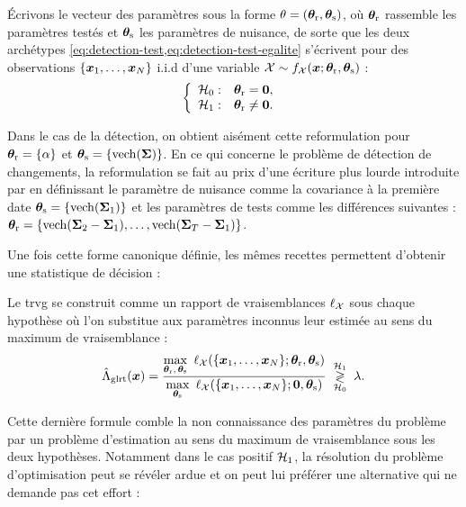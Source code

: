 Écrivons le vecteur des paramètres sous la forme $\theta=(\boldsymbol{\theta}_{\mathrm{r}},\boldsymbol{\theta}_{\mathrm{s}})$, où $\boldsymbol{\theta}_{\mathrm{r}}$ rassemble les paramètres testés et $\boldsymbol{\theta}_{\mathrm{s}}$ les paramètres de nuisance, de sorte que les deux archétypes \cref{eq:detection-test,eq:detection-test-egalite} s'écrivent pour des observations $\{\boldsymbol{x}_1, \dots, \boldsymbol{x}_N\}$ i.i.d d'une variable $\mathcal{X}\sim f_{\mathcal{X}}(\boldsymbol{x}; \boldsymbol{\theta}_{\mathrm{r}},\boldsymbol{\theta}_{\mathrm{s}})$ :
\begin{equation}
  \left\{
  \begin{array}{ll}
    \mathcal{H}_0: & \boldsymbol{\theta}_{\mathrm{r}} = \boldsymbol{0},\  \\
    \mathcal{H}_1: & \boldsymbol{\theta}_{\mathrm{r}} \neq \boldsymbol{0}.
  \end{array}
  \right.
  \label{eq:detection-test-parametre}
\end{equation}

Dans le cas de la détection, on obtient aisément cette reformulation pour $\boldsymbol{\theta}_{\mathrm{r}}=\{\alpha\}$ et $\boldsymbol{\theta}_{\mathrm{s}}=\{\operatorname{\operatorname{vech}}(\boldsymbol{\Sigma})\}$. En ce qui concerne le problème de détection de changements, la reformulation se fait au prix d'une écriture plus lourde introduite par  en définissant le paramètre de nuisance comme la covariance à la première date $\boldsymbol{\theta}_{\mathrm{s}}=\{\operatorname{\operatorname{vech}}(\boldsymbol{\Sigma}_1)\}$ et les paramètres de tests comme les différences suivantes : $\boldsymbol{\theta}_{\mathrm{r}} = \{\operatorname{\operatorname{vech}}(\boldsymbol{\Sigma}_2-\boldsymbol{\Sigma}_1), \dots, \operatorname{\operatorname{vech}}(\boldsymbol{\Sigma}_T-\boldsymbol{\Sigma}_1)\}$.

Une fois cette forme canonique définie, les mêmes recettes permettent d'obtenir une statistique de décision :

\begin{definition}
\label{def:detection-glrt}
Le trvg se construit comme un rapport de vraisemblances $\ell_{\mathcal{X}}$ sous chaque hypothèse où l'on substitue aux paramètres inconnus leur estimée au sens du maximum de vraisemblance :
  \begin{equation}
    \statGLRT(\x)
    =
    \frac{\displaystyle\max_{\paramtest,\,\paramnuis}\ \likelihood_{\Variable}(\{\x_1,\dots,\x_\Nobs\};\paramtest,\paramnuis)}
         {\displaystyle\max_{\paramnuis}\ \likelihood_{\Variable}(\{\x_1,\dots,\x_\Nobs\};\vector{0},\paramnuis)}
    \detect.
    \label{eq:detection-glrt}
  \end{equation}
\end{definition}

Cette dernière formule comble la non connaissance des paramètres du problème par un problème d'estimation au sens du maximum de vraisemblance sous les deux hypothèses. Notamment dans le cas positif $\mathcal{H}_1$, la résolution du problème d'optimisation peut se révéler ardue et on peut lui préférer une alternative qui ne demande pas cet effort :


